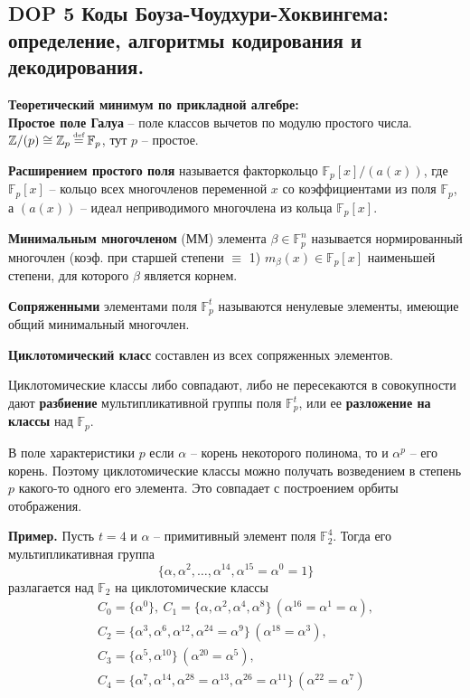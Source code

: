 \newcommand\eqdef{\mathrel{\stackrel{\makebox[0pt]{\mbox{\normalfont\tiny def}}}{=}}}


\subsection*{DOP 5 Коды Боуза-Чоудхури-Хоквингема: определение, алгоритмы кодирования и декодирования.}


\textbf{Теоретический минимум по прикладной алгебре:}\\
\textbf{Простое поле Галуа} -- поле классов вычетов по модулю простого числа.
$\mathbb{Z}/(p) \cong \mathbb{Z}_p \eqdef \mathbb{F}_p$, тут $p$ -- простое.

\textbf{Расширением простого поля} называется факторкольцо $\mathbb{F}_p[x]/(a(x))$, где
$\mathbb{F}_p[x]$ -- кольцо всех многочленов переменной $x$ со коэффициентами из поля
$\mathbb{F}_p$, а $(a(x))$ -- идеал неприводимого многочлена из кольца $\mathbb{F}_p[x]$.

\textbf{Минимальным многочленом} (ММ) элемента $\beta \in \mathbb{F}_p^n$ называется
нормированный многочлен (коэф. при старшей степени $\equiv$ 1)
$m_{\beta} (x) \in \mathbb{F}_p[x]$ наименьшей степени, для которого $\beta$ является
корнем.

\textbf{Сопряженными} элементами поля $\mathbb{F}_p^t$ называются ненулевые элементы,
имеющие общий минимальный многочлен.

\textbf{Циклотомический класс} составлен из всех сопряженных элементов.

Циклотомические классы либо совпадают, либо не пересекаются в совокупности дают
\textbf{разбиение} мультипликативной группы поля $\mathbb{F}_p^t$, или ее
\textbf{разложение на классы} над $\mathbb{F}_p$.

В поле характеристики $p$ если $\alpha$ -- корень некоторого полинома,
то и $\alpha^p$ -- его корень. Поэтому циклотомические классы можно получать
возведением в степень $p$ какого-то одного его элемента. Это совпадает с построением
орбиты отображения.

\textbf{Пример.} Пусть $t = 4$ и $\alpha$ -- примитивный элемент
поля $\mathbb{F}^4_2$. Тогда его мультипликативная группа
$$
\{ \alpha, \alpha^2, \dots, \alpha^{14}, \alpha^{15} = \alpha^0 = 1 \}
$$
разлагается над $\mathbb{F}_2$ на циклотомические классы
\begin{gather*}
    C_0 = \{\alpha^0\},
    ~C_1 = \{\alpha, \alpha^2, \alpha^4, \alpha^8 \} \, (\alpha^{16} = \alpha^1 = \alpha),\\
    C_2 = \{\alpha^3, \alpha^6, \alpha^{12}, \alpha^{24} = \alpha^9\} \, (\alpha^{18} = \alpha^3),\\
    C_3 = \{\alpha^5, \alpha^{10}\} \, (\alpha^{20} = \alpha^5),\\
    C_4 = \{\alpha^7, \alpha^{14}, \alpha^{28} = \alpha^{13}, \alpha^{26} = \alpha^{11}\} \, (\alpha^{22} = \alpha^7)
\end{gather*}

